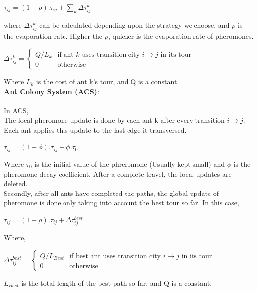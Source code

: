 \documentclass[11pt, english]{article}
\begin{document}
\begin{center}
$\tau_{ij} = (1-\rho).\tau_{ij} + \sum_{k}\Delta \tau_{ij}^k$
\end{center}
where $\Delta \tau_{ij}^k$ can be calculated depending upon the strategy we choose, and $\rho$ is the evaporation rate. Higher the $\rho$, quicker is the evaporation rate of pheromones.\\
\begin{center}
$\Delta \tau _{ij}^{k}={\begin{cases}Q/L_{k}&{\mbox{if ant }}k{\mbox{ uses transition city }}i \rightarrow j{\mbox{ in its tour}}\\0&{\mbox{otherwise}}\end{cases}}$\\
\end{center}
\noindent
Where $L_{k}$ is the cost of ant k's tour, and Q is a constant.\\

\noindent
{\bf Ant Colony System (ACS)}: \\
\\
In ACS,\\
The local pheromone update is done by each ant k after every transition $i \rightarrow j$. Each ant applies this update to the last edge it transversed.
\begin{center} {$\tau_{ij} = (1-\phi).\tau_{ij} + \phi.\tau_{0}$} \end{center}
Where $\tau_{0}$ is the initial value of the phreromone (Usually kept small) and $\phi$ is the pheromone decay coefficient. After a complete travel, the local updates are deleted.\cite{Dorigo1997}\\

\noindent
Secondly, after all ants have completed the paths, the global update of pheromone is done only taking into account the best tour so far. In this case, 

\begin{center}
$\tau_{ij} = (1-\rho).\tau_{ij} + \Delta \tau_{ij}^{best}$
\end{center}
\noindent
Where,
\begin{center}
$\Delta \tau _{ij}^{best}={\begin{cases}Q/L_{Best}&{\mbox{if best ant}}{\mbox{ uses transition city }}i \rightarrow j{\mbox{ in its tour}}\\0&{\mbox{otherwise}}\end{cases}}$\\
\end{center}
\noindent
$L_{Best}$ is the total length of the best path so far, and Q is a constant.\\
 
\end{document}
